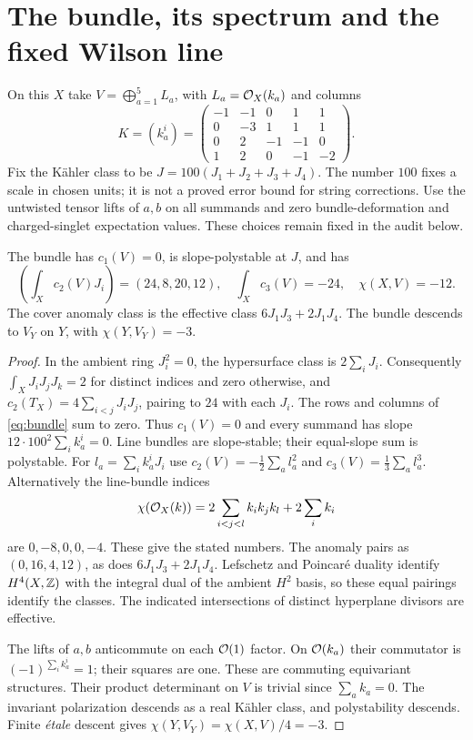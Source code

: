 \section{The bundle, its spectrum and the fixed Wilson line}\label{sec:fixedbundle}
On this $X$ take $V=\bigoplus_{a=1}^5 L_a$, with $L_a=\mathcal{O}_X(k_a)$
and columns
\begin{equation}\label{eq:bundle}
 K=(k_a^i)=\begin{pmatrix}
 -1&-1&0&1&1\\0&-3&1&1&1\\0&2&-1&-1&0\\1&2&0&-1&-2
 \end{pmatrix}.
\end{equation}
Fix the K\"ahler class to be $J=100(J_1+J_2+J_3+J_4)$.
The number $100$ fixes a scale in chosen units; it is not a proved
error bound for string corrections. Use the untwisted tensor lifts
of $a,b$ on all summands and zero bundle-deformation and charged-singlet
expectation values. These choices remain fixed in the audit below.

\begin{proposition}\label{prop:cover}
The bundle has $c_1(V)=0$, is slope-polystable at $J$, and has
\[
 \left(\int_X c_2(V)J_i\right)=(24,8,20,12),\quad
 \int_Xc_3(V)=-24,\quad\chi(X,V)=-12.
\]
The cover anomaly class is the effective class $6J_1J_3+2J_1J_4$.
The bundle descends to $V_Y$ on $Y$, with $\chi(Y,V_Y)=-3$.
\end{proposition}
\begin{proof}
In the ambient ring $J_i^2=0$, the hypersurface class is $2\sum_iJ_i$.
Consequently $\int_XJ_iJ_jJ_k=2$ for distinct indices and zero otherwise,
and $c_2(T_X)=4\sum_{i<j}J_iJ_j$, pairing to $24$ with each $J_i$.
The rows and columns of \eqref{eq:bundle} sum to zero. Thus $c_1(V)=0$
and every summand has slope $12\cdot100^2\sum_i k_a^i=0$.
Line bundles are slope-stable; their equal-slope sum is polystable.
For $l_a=\sum_i k_a^iJ_i$ use
$c_2(V)=-\tfrac12\sum_a l_a^2$ and $c_3(V)=\tfrac13\sum_a l_a^3$.
Alternatively the line-bundle indices
\[
 \chi(\mathcal{O}_X(k))=2\sum_{i<j<l}k_i k_j k_l+2\sum_i k_i
\]
are $0,-8,0,0,-4$. These give the stated numbers.
The anomaly pairs as $(0,16,4,12)$, as does $6J_1J_3+2J_1J_4$.
Lefschetz and Poincar\'e duality identify $H^4(X,\mathbb{Z})$ with the integral
dual of the ambient $H^2$ basis, so these equal pairings identify the
classes. The indicated intersections of distinct hyperplane divisors
are effective.

The lifts of $a,b$ anticommute on each $\mathcal{O}(1)$ factor. On
$\mathcal{O}(k_a)$ their commutator is $(-1)^{\sum_i k_a^i}=1$; their squares
are one. These are commuting equivariant structures. Their product
determinant on $V$ is trivial since $\sum_a k_a=0$. The invariant
polarization descends as a real K\"ahler class, and polystability descends.
Finite \emph{\'etale} descent gives $\chi(Y,V_Y)=\chi(X,V)/4=-3$.
\end{proof}

